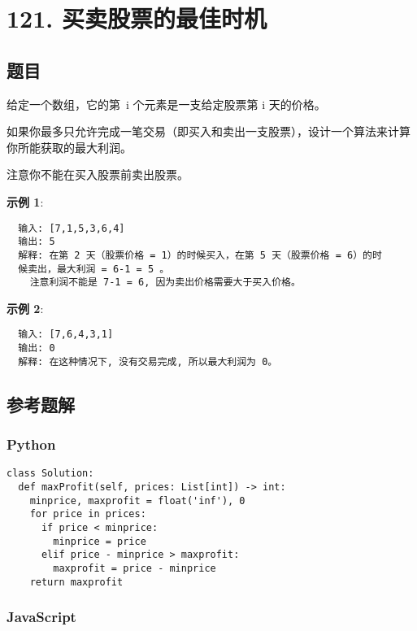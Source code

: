 \newpage
\section{121. 买卖股票的最佳时机}
\label{leetcode:121}

\subsection{题目}

给定一个数组，它的第 i 个元素是一支给定股票第 i 天的价格。

如果你最多只允许完成一笔交易（即买入和卖出一支股票），设计一个算法来计算你所能获取的最大利润。

注意你不能在买入股票前卖出股票。

\textbf{示例 1}:

\begin{verbatim}
  输入: [7,1,5,3,6,4]
  输出: 5
  解释: 在第 2 天（股票价格 = 1）的时候买入，在第 5 天（股票价格 = 6）的时
  候卖出，最大利润 = 6-1 = 5 。
    注意利润不能是 7-1 = 6, 因为卖出价格需要大于买入价格。
\end{verbatim}

\textbf{示例 2}:

\begin{verbatim}
  输入: [7,6,4,3,1]
  输出: 0
  解释: 在这种情况下, 没有交易完成, 所以最大利润为 0。
\end{verbatim}

\subsection{参考题解}

\subsubsection{Python}

\begin{verbatim}
class Solution:
  def maxProfit(self, prices: List[int]) -> int:
    minprice, maxprofit = float('inf'), 0
    for price in prices:
      if price < minprice:
        minprice = price
      elif price - minprice > maxprofit:
        maxprofit = price - minprice
    return maxprofit
\end{verbatim}

\subsubsection{JavaScript}

